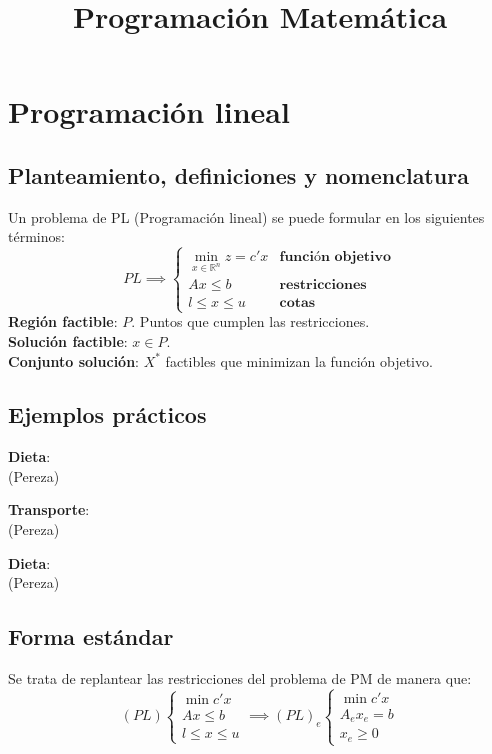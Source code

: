 \documentclass{myclass}
\title{Programación Matemática}
\begin{document}
\maketitle
\tableofcontents
\newpage

\section{Programación lineal}
\subsection{Planteamiento, definiciones y nomenclatura}
Un problema de PL (Programación lineal) se puede formular en los siguientes términos:
$$ PL \implies 
\begin{cases}
\min_{x\in \mathbb{R}^n} z = c'x & \textbf{función objetivo} \\
Ax\leq b & \textbf{restricciones}  \\
l\leq x\leq u & \textbf{cotas} 
\end{cases}
$$
\textbf{Región factible}: $P$. Puntos que cumplen las restricciones. \\
\textbf{Solución factible}: $x\in P$. \\
\textbf{Conjunto solución}: $X^*$ factibles que minimizan la función objetivo. \\

\subsection{Ejemplos prácticos}
\textbf{Dieta}: \\
(Pereza)

\textbf{Transporte}: \\
(Pereza)

\textbf{Dieta}: \\
(Pereza)


\subsection{Forma estándar}
Se trata de replantear las restricciones del problema de PM de manera que:
$$
(PL)
\begin{cases}
    \min c'x \\
    Ax\leq b \\
    l\leq x\leq u
\end{cases}
\implies
(PL)_e
\begin{cases}
    \min c'x \\
    A_ex_e= b \\
    x_e\geq 0
\end{cases}
$$
\end{document}
